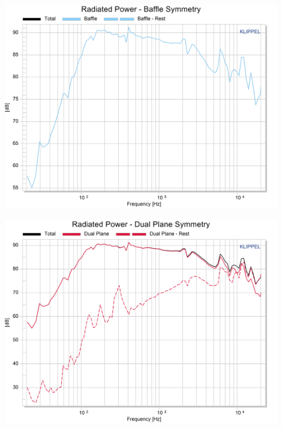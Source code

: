 \documentclass{report}
\begin{document}
\begin{appendices}
\begin{minipage}{0.5\textwidth}
\begin{center}
	\includegraphics[width=0.9\textwidth]{Sym/10cm_RadPow_B}
    \captionsetup{hypcap=false}
\end{center}
\end{minipage}
\begin{minipage}{0.5\textwidth}
\begin{center}
	\includegraphics[width=0.9\textwidth]{Sym/10cm_RadPow_Dps}
    \captionsetup{hypcap=false}
\end{center}
\end{minipage}


\end{appendices}
\end{document}
